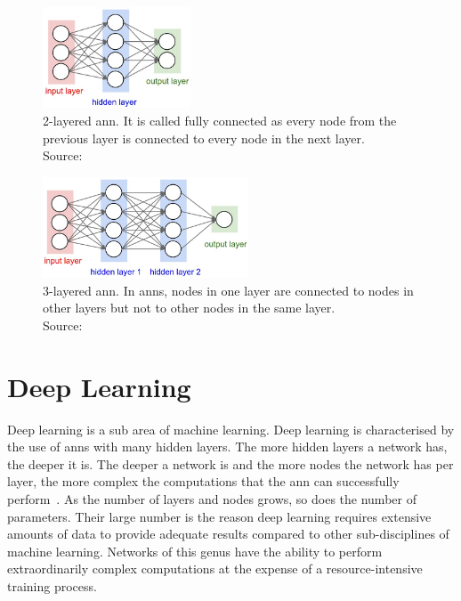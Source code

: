 \documentclass[
			   fontsize=11pt,
               paper=a4,
               bibliography=totoc,
               idxtotoc,
               headsepline,
               footsepline,
               footinclude=false,
               BCOR=12mm,
               DIV=13,
               openany,   %
               ]
               {scrbook}
\begin{document}
\begin{multicols}{2} %
	\begin{figure}[H] %
		\centering
		\includegraphics[height=3cm]{figures/ann1.jpeg}
		\caption[2-Layered ANN]{2-layered \gls{ann}. It is called fully connected as every node from the previous layer is connected to every node in the next layer. \\
			\tiny{Source:~\cite{annGraphics}}}
		\label{fig:2layeredANN} %
	\end{figure}
	
	\columnbreak    %
	
	\begin{figure}[H] %
		\centering
		\includegraphics[height=3cm]{figures/ann2.jpeg}
		\caption[3-Layered ANN]{3-layered \gls{ann}. In \glspl{ann}, nodes in one layer are connected to nodes in other layers but not to other nodes in the same layer. \\
			\tiny{Source:~\cite{annGraphics}}}
		\label{fig:3layeredANN} %
	\end{figure}
\end{multicols}

\newpage

\section{Deep Learning}

Deep learning is a sub area of machine learning. Deep learning is characterised by the use of \glspl{ann} with many hidden layers. The more hidden layers a network has, the deeper it is. The deeper a network is and the more nodes the network has per layer, the more complex the computations that the \gls{ann} can successfully perform~\cite{dlBookGoodf}. As the number of layers and nodes grows, so does the number of parameters. Their large number is the reason deep learning requires extensive amounts of data to provide adequate results compared to other sub-disciplines of machine learning. Networks of this genus have the ability to perform extraordinarily complex computations at the expense of a resource-intensive training process.
\end{document}
